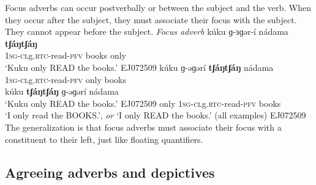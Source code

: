 Focus adverbs can occur postverbally or between the subject and the verb. When they occur after the subject, they must associate their focus with the subject. They cannot appear before the subject.
\ea  \textit{Focus adverb}
\ea \gll 	kúku ɡ-ɜɡər-í	nádama	\textbf{tʃáŋtʃáŋ}\\
	1\textsc{sg}-\textsc{cl}g.\textsc{rtc}-read-\textsc{pfv}	books		only\\
	`Kuku only READ the books.' \hfill EJ072509
\ex \gll	kúku ɡ-əɡərí		\textbf{tʃáŋtʃáŋ}	nádama	\\
	1\textsc{sg}-\textsc{cl}g.\textsc{rtc}-read-\textsc{pfv} only	books		\\
\ex	\gll kúku \textbf{tʃáŋtʃáŋ} ɡ-əɡərí		nádama \\ 
	`Kuku only READ the books.' \hfill EJ072509
only 1\textsc{sg}-\textsc{cl}g.\textsc{rtc}-read-\textsc{pfv}	books		\\
	\glt `I only read the BOOKS.', \textit{or} `I only READ the books.'	(all examples)  \hfill EJ072509
	\z 
\z
The generalization is that focus adverbs must associate their focus with a constituent to their left, just like floating quantifiers.


%

\subsection{Agreeing adverbs and depictives}\label{sec:ch13:agree}

